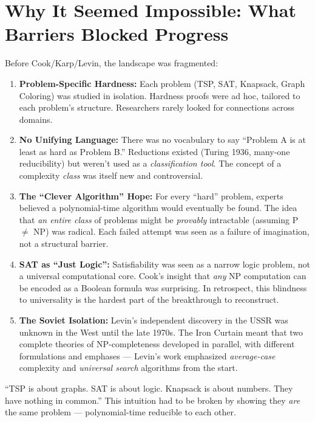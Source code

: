 \section{Why It Seemed Impossible: What Barriers Blocked Progress}
\label{sec:np:impossible}

Before Cook/Karp/Levin, the landscape was fragmented:

\begin{enumerate}
\item \textbf{Problem-Specific Hardness:} Each problem (TSP, SAT, Knapsack, Graph Coloring) was studied in isolation. Hardness proofs were ad hoc, tailored to each problem's structure. Researchers rarely looked for connections across domains.
\item \textbf{No Unifying Language:} There was no vocabulary to say ``Problem A is at least as hard as Problem B.'' Reductions existed (Turing 1936, many-one reducibility) but weren't used as a \emph{classification tool}. The concept of a complexity \emph{class} was itself new and controversial.
\item \textbf{The ``Clever Algorithm'' Hope:} For every ``hard'' problem, experts believed a polynomial-time algorithm would eventually be found. The idea that \emph{an entire class} of problems might be \emph{provably} intractable (assuming P $\neq$ NP) was radical. Each failed attempt was seen as a failure of imagination, not a structural barrier.
\item \textbf{SAT as ``Just Logic'':} Satisfiability was seen as a narrow logic problem, not a universal computational core. Cook's insight that \emph{any} NP computation can be encoded as a Boolean formula was surprising. In retrospect, this blindness to universality is the hardest part of the breakthrough to reconstruct.
\item \textbf{The Soviet Isolation:} Levin's independent discovery in the USSR was unknown in the West until the late 1970s. The Iron Curtain meant that two complete theories of NP-completeness developed in parallel, with different formulations and emphases — Levin's work emphasized \emph{average-case} complexity and \emph{universal search} algorithms from the start.
\end{enumerate}

``TSP is about graphs. SAT is about logic. Knapsack is about numbers. They have nothing in common.'' This intuition had to be broken by showing they \emph{are} the same problem — polynomial-time reducible to each other.

